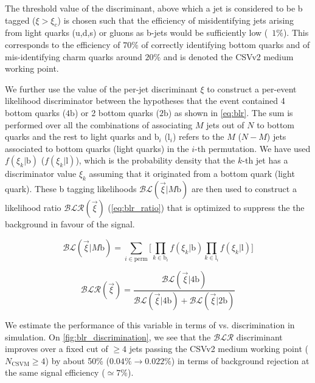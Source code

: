 The threshold value of the discriminant, above which a jet is considered to be b tagged ($\xi > \xi_c$) is chosen such that the efficiency of misidentifying jets arising from light quarks (u,d,s) or gluons as b-jets would be sufficiently low (~$1\%$). This corresponds to the efficiency of $70\%$ of correctly identifying bottom quarks and of mis-identifying charm quarks around $20\%$ and is denoted the CSVv2 medium working point.

We further use the value of the per-jet discriminant $\xi$ to construct a per-event likelihood discriminator between the hypotheses that the event contained 4 bottom quarks ($4\mathrm{b}$) or 2 bottom quarks ($2\mathrm{b}$) as shown in \cref{eq:blr}. The sum is performed over all the combinations of associating $M$ jets out of $N$ to bottom quarks and the rest to light quarks and $\mathrm{b}_i$ ($\mathrm{l}_i$) refers to the $M$ ($N-M$) jets associated to bottom quarks (light quarks) in the $i$-th permutation. We have used $f(\xi_k | \mathrm{b})$ ($f(\xi_k | \mathrm{l})$), which is the probability density that the $k$-th jet has a discriminator value $\xi_k$ assuming that it originated from a bottom quark (light quark). These b tagging likelihoods $\mathcal{BL}(\vec{\xi} | M\mathrm{b})$ are then used to construct a likelihood ratio $\mathcal{BLR}(\vec{\xi})$ (\cref{eq:blr_ratio}) that is optimized to suppress the the \ttlf background in favour of the \ttHbb signal.

\begin{equation}
\label{eq:blr}
\mathcal{BL}(\vec{\xi} | M\mathrm{b}) = \sum_{i \in \mathrm{perm}} \biggl[ \prod_{k \in \mathrm{b}_i} f(\xi_k | \mathrm{b}) \prod_{k \in \mathrm{l}_i} f(\xi_k | \mathrm{l}) \biggr]
\end{equation}

\begin{equation}
\label{eq:blr_ratio}
\mathcal{BLR}(\vec{\xi}) = \frac{\mathcal{BL}(\vec{\xi} | 4\mathrm{b})}{\mathcal{BL}(\vec{\xi} | 4\mathrm{b}) + \mathcal{BL}(\vec{\xi} | 2\mathrm{b})}
\end{equation}

We estimate the performance of this variable in terms of \ttHbb vs. \ttlf discrimination in simulation. On \cref{fig:blr_discrimination}, we see that the $\mathcal{BLR}$ discriminant improves over a fixed cut of $\ge4$ jets passing the CSVv2 medium working point ($N_{\mathrm{CSVM}} \ge 4$) by about 50\% ($0.04\% \rightarrow 0.022\%$) in terms of background rejection at the same signal efficiency ($\simeq 7\%$).


